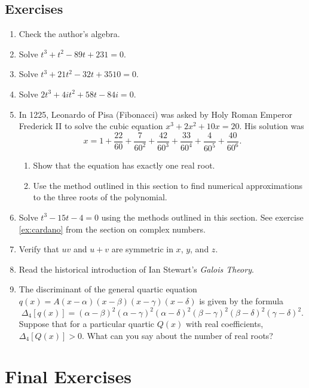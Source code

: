 \documentclass[a4paper,10pt,titlepage]{article}
\theoremstyle{definition}
\newcommand{\harder}{\refstepcounter{enumi}\item[$^{\star\star}$\theenumi.]}
\begin{document}
\subsection*{Exercises}
\begin{enumerate}
  \harder Check the author's algebra.
  \item Solve $ t^3 + t^2 - 89t + 231 = 0 $.
  \item Solve $ t^3 + 21t^2 - 32t + 3510 = 0 $.
  \item Solve $ 2t^3 + 4i t^2 + 58t - 84i = 0 $.
  \item In 1225, Leonardo of Pisa (Fibonacci) was asked by Holy Roman Emperor Frederick II
        to solve the cubic equation $ x^3 + 2x^2 + 10x = 20 $. His solution was
        \begin{displaymath}
          x = 1 + \frac{22}{60} + \frac{7}{60^2} + \frac{42}{60^3} + \frac{33}{60^4} + \frac{4}{60^5} + \frac{40}{60^6}.
        \end{displaymath}
        \begin{enumerate}
          \item Show that the equation has exactly one real root.
          \item Use the method outlined in this section to find numerical approximations to the three roots
                of the polynomial.
        \end{enumerate}
  \item Solve $ t^3 - 15t - 4 = 0 $ using the methods outlined in this section. See exercise \ref{ex:cardano}
        from the section on complex numbers.
  \item Verify that $ uv $ and $ u + v $ are symmetric in $ x $, $ y $, and $ z $.
  \item Read the historical introduction of Ian Stewart's \textit{Galois Theory}.
  \item The discriminant of the general quartic equation $ q(x) = A(x - \alpha)(x - \beta)(x - \gamma)(x - \delta) $ is
        given by the formula
        \begin{displaymath}
          \Delta_4 [q(x)] = (\alpha - \beta)^2(\alpha - \gamma)^2(\alpha - \delta)^2(\beta - \gamma)^2(\beta - \delta)^2(\gamma - \delta)^2.
        \end{displaymath}
        Suppose that for a particular quartic $ Q(x) $ with real coefficients, $ \Delta_4[Q(x)] > 0 $. What can you say about the number of real roots?
\end{enumerate}

\section{Final Exercises}
\end{document}
